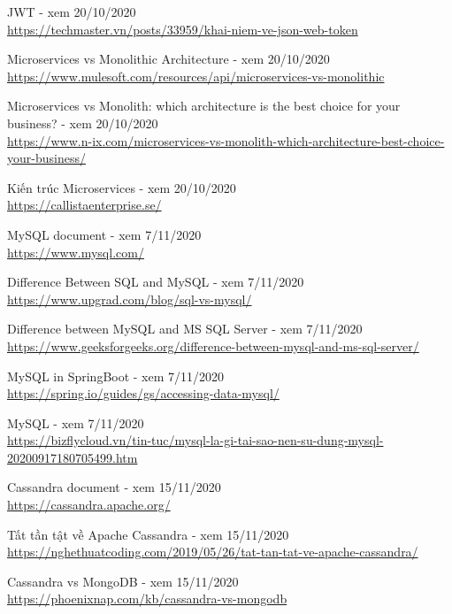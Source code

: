 \documentclass[12pt,a4paper,oneside]{book}
\begin{document}
\begin{thebibliography}{80}
         JWT - xem 20/10/2020\\
        \url{https://techmaster.vn/posts/33959/khai-niem-ve-json-web-token}
        
        \bibitem{} Microservices vs Monolithic Architecture - xem 20/10/2020\\
        \url{https://www.mulesoft.com/resources/api/microservices-vs-monolithic}
        
        \bibitem{} Microservices vs Monolith: which architecture is the best choice for your business? - xem 20/10/2020\\
        \url{https://www.n-ix.com/microservices-vs-monolith-which-architecture-best-choice-your-business/}
        
        \bibitem{} Kiến trúc Microservices - xem 20/10/2020\\
        \url{https://callistaenterprise.se/}
        
         MySQL document - xem 7/11/2020\\
        \url{https://www.mysql.com/}
        
        \bibitem{} Difference Between SQL and MySQL - xem 7/11/2020\\
        \url{https://www.upgrad.com/blog/sql-vs-mysql/}
        
        \bibitem{} Difference between MySQL and MS SQL Server - xem 7/11/2020\\
        \url{https://www.geeksforgeeks.org/difference-between-mysql-and-ms-sql-server/}
        
         \bibitem{} MySQL in SpringBoot - xem 7/11/2020\\
        \url{https://spring.io/guides/gs/accessing-data-mysql/}
        
        \bibitem{} MySQL - xem 7/11/2020\\
        \url{https://bizflycloud.vn/tin-tuc/mysql-la-gi-tai-sao-nen-su-dung-mysql-20200917180705499.htm}
        
         Cassandra document - xem 15/11/2020\\
        \url{https://cassandra.apache.org/}
        
        \bibitem{} Tất tần tật về Apache Cassandra - xem 15/11/2020\\
        \url{https://nghethuatcoding.com/2019/05/26/tat-tan-tat-ve-apache-cassandra/}
        
        \bibitem{} Cassandra vs MongoDB - xem 15/11/2020\\
        \url{https://phoenixnap.com/kb/cassandra-vs-mongodb}
        

\end{thebibliography}
\end{document}
